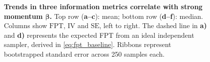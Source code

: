 \begin{figure}[htbp]
  \centering
  \hfill
  \hfill

  \medskip

  \hfill
  \hfill
  \caption{\textbf{Trends in three information metrics correlate with strong momentum $\bm{\beta}$.} Top row (\textbf{a--c}): mean; bottom row (\textbf{d--f}): median. Columns show $\mathrm{FPT}$, $\mathrm{IV}$ and $\mathrm{SE}$, left to right. The dashed line in \textbf{a)} and \textbf{d)} represents the expected FPT from an ideal independent sampler, derived in \cref{eq:fpt_baseline}. Ribbons represent bootstrapped standard error across 250 samples each.}
  \label{fig:beta_metrics}
\end{figure}